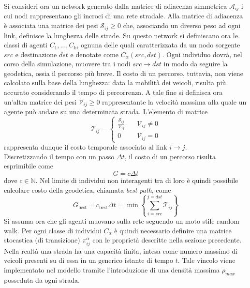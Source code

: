 \documentclass[../main.tex]{subfiles}
\begin{document}
Si consideri ora un network generato dalla matrice di adiacenza simmetrica $\mathcal{A}_{ij}$ i cui nodi rappresentano gli incroci di una rete stradale.
Alla matrice di adiacenza \`e associata una matrice dei pesi $\mathcal{S}_{ij} \geq 0$ che, associando un diverso peso ad ogni link, definisce la lunghezza delle strade.
Su questo network si definiscano ora le classi di agenti $C_{1},\ldots,C_{k}$, ognuna delle quali caratterizzata da un nodo sorgente $src$ e destinazione $dst$ e denotate come $C_{\alpha}(src,dst)$.
Ogni individuo dovr\`a, nel corso della simulazione, muovere tra i nodi $src\to dst$ in modo da seguire la geodetica, ossia il percorso pi\`u breve.
Il costo di un percorso, tuttavia, non viene calcolato sulla base della lunghezza: data la mobilit\`a dei veicoli, risulta pi\`u accurato considerando il tempo di percorrenza.
A tale fine si definisca ora un'altra matrice dei pesi $\mathcal{V}_{ij} \geq 0$ rappresentante la velocit\`a massima alla quale un agente pu\`o andare su una determinata strada.
L'elemento di matrice
\begin{equation}
    \mathcal{T}_{ij}=
    \begin{cases}
        \frac{\mathcal{S}_{ij}}{\mathcal{V}_{ij}} \quad& \mathcal{V}_{ij} \neq 0\\
        0 \quad& \mathcal{V}_{ij} = 0
    \end{cases}
\end{equation}
rappresenta dunque il costo temporale associato al link $i \to j$.\\
Discretizzando il tempo con un passo $\Delta t$, il costo di un percorso risulta esprimibile come
\begin{equation}
    G=c\Delta t
\end{equation}
dove $c \in \mathbb{N}$.
Nel limite di individui non interagenti tra di loro \`e quindi possibile calcolare costo della geodetica, chiamata \emph{best path}, come
\begin{equation}
    G_{\text{best}} = c_{\text{best}}\Delta t = \min \left\{\sum_{i=src}^{j=dst}\mathcal{T}_{ij}\right\}
    \label{eq:best_path}
\end{equation}
Si assuma ora che gli agenti muovano sulla rete seguendo un moto stile random walk.
Per ogni classe di individui $C_{\alpha}$ \`e quindi necessario definire una matrice stocastica (di transizione) $\pi_{ij}^{\alpha}$ con le propriet\`a descritte nella sezione precedente.
Nella realt\`a una strada ha una capacit\`a finita, intesa come numero massimo di veicoli presenti su di essa in un generico istante di tempo $t$.
Tale vincolo viene implementato nel modello tramite l'introduzione di una densit\`a massima $\rho_{max}$ posseduta da ogni strada.
\end{document}
